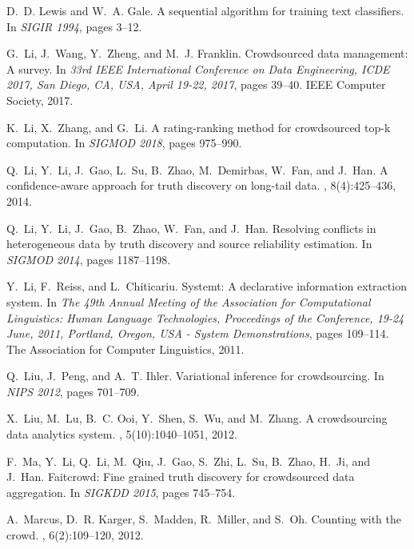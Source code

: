 \documentclass[11pt]{article}
\newcounter{alg}[section]
\begin{document}
\begin{thebibliography}{10}
	D.~D. Lewis and W.~A. Gale.
	\newblock A sequential algorithm for training text classifiers.
	\newblock In {\em {SIGIR} 1994}, pages 3--12.
	
	G.~Li, J.~Wang, Y.~Zheng, and M.~J. Franklin.
	\newblock Crowdsourced data management: {A} survey.
	\newblock In {\em 33rd {IEEE} International Conference on Data Engineering,
		{ICDE} 2017, San Diego, CA, USA, April 19-22, 2017}, pages 39--40. {IEEE}
	Computer Society, 2017.
	
	K.~Li, X.~Zhang, and G.~Li.
	\newblock A rating-ranking method for crowdsourced top-k computation.
	\newblock In {\em {SIGMOD} 2018}, pages 975--990.
	
	Q.~Li, Y.~Li, J.~Gao, L.~Su, B.~Zhao, M.~Demirbas, W.~Fan, and J.~Han.
	\newblock A confidence-aware approach for truth discovery on long-tail data.
	, 8(4):425--436, 2014.
	
	Q.~Li, Y.~Li, J.~Gao, B.~Zhao, W.~Fan, and J.~Han.
	\newblock Resolving conflicts in heterogeneous data by truth discovery and
	source reliability estimation.
	\newblock In {\em {SIGMOD} 2014}, pages 1187--1198.
	
	Y.~Li, F.~Reiss, and L.~Chiticariu.
	\newblock Systemt: {A} declarative information extraction system.
	\newblock In {\em The 49th Annual Meeting of the Association for Computational
		Linguistics: Human Language Technologies, Proceedings of the Conference,
		19-24 June, 2011, Portland, Oregon, {USA} - System Demonstrations}, pages
	109--114. The Association for Computer Linguistics, 2011.
	
	Q.~Liu, J.~Peng, and A.~T. Ihler.
	\newblock Variational inference for crowdsourcing.
	\newblock In {\em NIPS 2012}, pages 701--709.
	
	X.~Liu, M.~Lu, B.~C. Ooi, Y.~Shen, S.~Wu, and M.~Zhang.
	 {A} crowdsourcing data analytics system.
	, 5(10):1040--1051, 2012.
	
	F.~Ma, Y.~Li, Q.~Li, M.~Qiu, J.~Gao, S.~Zhi, L.~Su, B.~Zhao, H.~Ji, and J.~Han.
	\newblock Faitcrowd: Fine grained truth discovery for crowdsourced data
	aggregation.
	\newblock In {\em SIGKDD 2015}, pages 745--754.
	
	A.~Marcus, D.~R. Karger, S.~Madden, R.~Miller, and S.~Oh.
	\newblock Counting with the crowd.
	, 6(2):109--120, 2012.
	

\end{thebibliography}
\end{document}
